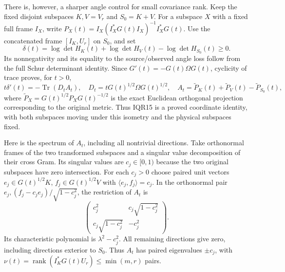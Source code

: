 \documentclass[11pt]{article}
\begin{document}
There is, however, a sharper angle control for small covariance rank.
Keep the fixed disjoint subspaces $K,V=V_r$ and $S_0=K+V$.
For a subspace $X$ with a fixed full frame $I_X$, write
$P_X(t)=I_X(I_X^*G(t)I_X)^{-1}I_X^*G(t)$.
Use the concatenated frame $[I_K,U_r]$ on $S_0$, and set
\[
\delta(t)=\log\det H_K(t)+\log\det H_V(t)
          -\log\det H_{S_0}(t)\ge0 .
\]
Its nonnegativity and its equality to the source/observed angle loss
follow from the full Schur determinant identity.
Since $G'(t)=-G(t)\Omega G(t)$, cyclicity of trace proves, for $t>0$,
\[
t\delta'(t)=-\operatorname{Tr}(D_t A_t),\quad
D_t=tG(t)^{1/2}\Omega G(t)^{1/2},\quad
A_t=\widetilde P_K(t)+\widetilde P_V(t)-\widetilde P_{S_0}(t),
\tag{IQR15}
\]
where $\widetilde P_X=G(t)^{1/2}P_XG(t)^{-1/2}$ is the exact
Euclidean orthogonal projection corresponding to the original metric.
Thus IQR15 is a proved coordinate identity, with both subspaces moving
under this isometry and the physical subspaces fixed.

Here is the spectrum of $A_t$, including all nontrivial directions.
Take orthonormal frames of the two transformed subspaces and a singular
value decomposition of their cross Gram. Its singular values are
$c_j\in[0,1)$ because the two original subspaces have zero intersection.
For each $c_j>0$ choose paired unit vectors
$e_j\in G(t)^{1/2}K$, $f_j\in G(t)^{1/2}V$
with $\langle e_j,f_j\rangle=c_j$.
In the orthonormal pair $e_j,(f_j-c_je_j)/\sqrt{1-c_j^2}$,
the restriction of $A_t$ is
\[
\begin{pmatrix}
c_j^2&c_j\sqrt{1-c_j^2}\\
c_j\sqrt{1-c_j^2}&-c_j^2
\end{pmatrix}.
\tag{IQR16}
\]
Its characteristic polynomial is $\lambda^2-c_j^2$.
All remaining directions give zero, including directions exterior to
$S_0$. Thus $A_t$ has paired eigenvalues $\pm c_j$, with
$\nu(t)=\operatorname{rank}(I_K^*G(t)U_r)\le\min(m,r)$ pairs.
\end{document}
